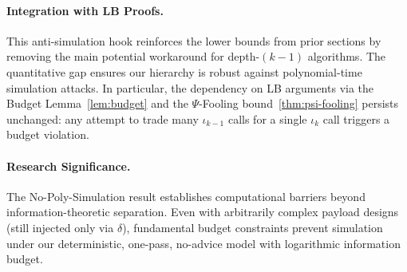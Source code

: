 \paragraph{Integration with LB Proofs.}
This anti-simulation hook reinforces the lower bounds from prior sections by removing the main potential workaround for depth-\((k{-}1)\) algorithms. The quantitative gap ensures our hierarchy is robust against polynomial-time simulation attacks. In particular, the dependency on LB arguments via the Budget Lemma~\ref{lem:budget} and the $\Psi$-Fooling bound~\ref{thm:psi-fooling} persists unchanged: any attempt to trade many $\iota_{k-1}$ calls for a single $\iota_k$ call triggers a budget violation.

\paragraph{Research Significance.}
The No-Poly-Simulation result establishes computational barriers beyond information-theoretic separation. Even with arbitrarily complex payload designs (still injected only via $\delta$), fundamental budget constraints prevent simulation under our deterministic, one-pass, no-advice model with logarithmic information budget.



